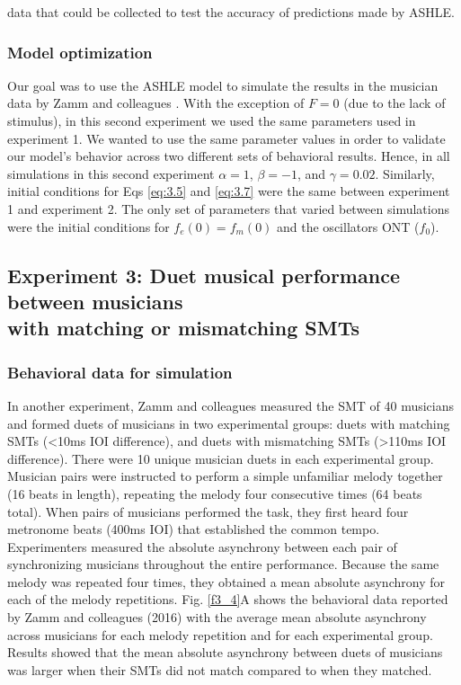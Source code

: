 \documentclass{report}
\begin{document}
data that could be collected to test the accuracy of predictions made by ASHLE.

\subsubsection{Model optimization}

Our goal was to use the ASHLE model to simulate the results in the musician data by Zamm and colleagues \cite{zamm2018musicians}. With the exception of $F = 0$	(due to the lack of stimulus), in this second experiment we used the same parameters used in experiment 1. We wanted to use the same parameter values in order to validate our model's behavior across two different sets of behavioral results. Hence, in all simulations in this second experiment $\alpha = 1$, $\beta = −1$, and $\gamma = 	0.02$. Similarly, initial conditions for Eqs \eqref{eq:3.5} and \eqref{eq:3.7} were the same between experiment 1 and experiment 2. The only set of parameters that varied between simulations were the initial conditions for $f_e(0)=f_m(0)$ and the oscillators ONT ($f_0$).

\subsection{Experiment 3: Duet musical performance between musicians \\ with matching or mismatching SMTs}

\subsubsection{Behavioral data for simulation}

In another experiment, Zamm and colleagues \cite{zamm2016endogenous} measured the SMT of 40 musicians and formed duets of musicians in two experimental groups: duets with matching SMTs (<10ms IOI difference), and duets with mismatching SMTs (>110ms IOI difference). There were 10 unique musician duets in each experimental group. Musician pairs were instructed to perform a simple unfamiliar melody together (16 beats in length), repeating the melody four consecutive times (64 beats total). When pairs of musicians performed the task, they first heard four metronome beats (400ms IOI) that established the common tempo. Experimenters measured the absolute asynchrony between each pair of synchronizing musicians throughout the entire performance. Because the same melody was repeated four times, they obtained a mean absolute asynchrony for each of the melody repetitions. Fig.{} \ref{f3_4}A shows the behavioral data reported by Zamm and colleagues (2016) with the average mean absolute asynchrony across musicians for each melody repetition and for each experimental group. Results showed that the mean absolute asynchrony between duets of musicians was larger when their SMTs did not match compared to when they matched.
\end{document}
